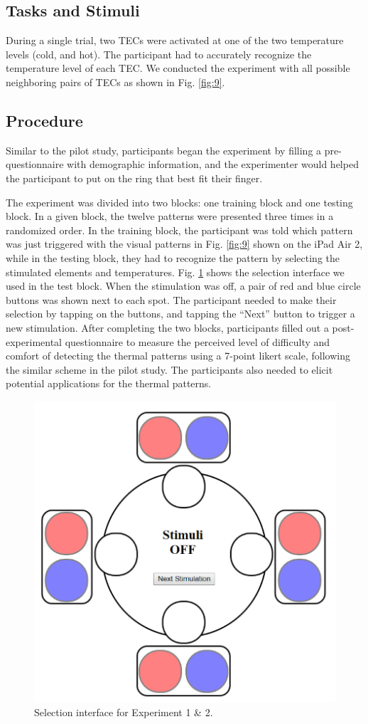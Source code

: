 \documentclass[preprint,12pt]{elsarticle}
\begin{document}
\subsection{Tasks and Stimuli}
During a single trial, two TECs were activated at one of the two temperature levels (cold, and hot). The participant had to accurately recognize the temperature level of each TEC. We conducted the experiment with all possible neighboring pairs of TECs as shown in Fig. \ref{fig:9}.


\subsection{Procedure}
Similar to the pilot study, participants began the experiment by filling a pre-questionnaire with demographic information, and the experimenter would helped the participant to put on the ring that best fit their finger.

The experiment was divided into two blocks: one training block and one testing block. In a given block, the twelve patterns were presented three times in a randomized order. In the training block, the participant was told which pattern was just triggered with the visual patterns in Fig. \ref{fig:9} shown on the iPad Air 2, while in the testing block, they had to recognize the pattern by selecting the stimulated elements and temperatures. Fig. \ref{fig:10} shows the selection interface we used in the test block. When the stimulation was off, a pair of red and blue circle buttons was shown next to each spot. The participant needed to make their selection by tapping on the buttons, and tapping the ``Next'' button to trigger a new stimulation. After completing the two blocks, participants filled out a post-experimental questionnaire to measure the perceived level of difficulty and comfort of detecting the thermal patterns using a 7-point likert scale, following the similar scheme in the pilot study. The participants also needed to elicit potential applications for the thermal patterns.

\begin{figure}[h]
  \centering
  \includegraphics[width=0.5\columnwidth]{img/fig10.pdf}
  \caption{Selection interface for Experiment 1 \& 2.}
  \label{fig:10}
\end{figure}
\end{document}
